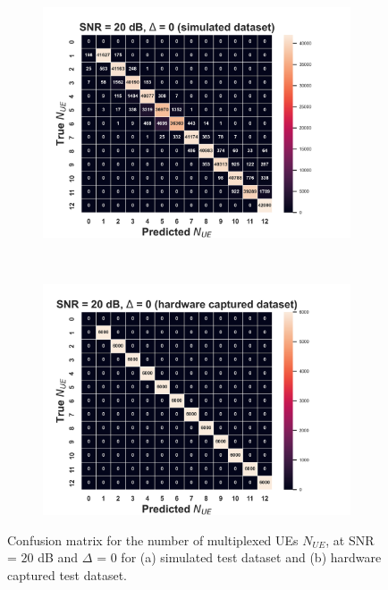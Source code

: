 \documentclass[journal]{IEEEtran}
\begin{document}

\begin{figure}[ht!]
    \captionsetup{justification=justified}
     \centering
     \begin{subfigure}[b]{0.48\textwidth}
         \centering
         \includegraphics[width=\textwidth]{Figures/Conf_mtx_num_UEs_SNR_20_dB_Max_off_0_train_sim_test_sim.png}
         \caption{}
         \label{fig: cm_num_UE_snr_20_off_0_sim}
     \end{subfigure}
     \\
     \begin{subfigure}[b]{0.48\textwidth}
         \centering
         \includegraphics[width=\textwidth]{Figures/Conf_mtx_num_UEs_SNR_20_dB_Max_off_0_train_sim_test_hw.png}
         \caption{}
         \label{fig: cm_num_UE_snr_20_off_0_hw}
     \end{subfigure}
        \caption{Confusion matrix for the number of multiplexed UEs $N_{UE}$, at SNR = $20$ dB and $\Delta$ = $0$ for (a) simulated test dataset and (b) hardware captured test dataset.}
        \label{fig: cm_num_UE_snr_20_off_0}
\end{figure}
\end{document}
